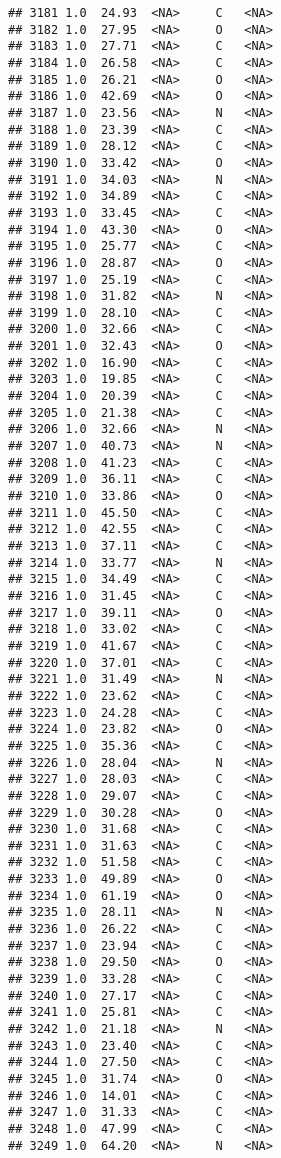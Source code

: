 \documentclass[
]{article}
\begin{document}
\begin{verbatim}
## 3181 1.0  24.93  <NA>     C   <NA>
## 3182 1.0  27.95  <NA>     O   <NA>
## 3183 1.0  27.71  <NA>     C   <NA>
## 3184 1.0  26.58  <NA>     C   <NA>
## 3185 1.0  26.21  <NA>     O   <NA>
## 3186 1.0  42.69  <NA>     O   <NA>
## 3187 1.0  23.56  <NA>     N   <NA>
## 3188 1.0  23.39  <NA>     C   <NA>
## 3189 1.0  28.12  <NA>     C   <NA>
## 3190 1.0  33.42  <NA>     O   <NA>
## 3191 1.0  34.03  <NA>     N   <NA>
## 3192 1.0  34.89  <NA>     C   <NA>
## 3193 1.0  33.45  <NA>     C   <NA>
## 3194 1.0  43.30  <NA>     O   <NA>
## 3195 1.0  25.77  <NA>     C   <NA>
## 3196 1.0  28.87  <NA>     O   <NA>
## 3197 1.0  25.19  <NA>     C   <NA>
## 3198 1.0  31.82  <NA>     N   <NA>
## 3199 1.0  28.10  <NA>     C   <NA>
## 3200 1.0  32.66  <NA>     C   <NA>
## 3201 1.0  32.43  <NA>     O   <NA>
## 3202 1.0  16.90  <NA>     C   <NA>
## 3203 1.0  19.85  <NA>     C   <NA>
## 3204 1.0  20.39  <NA>     C   <NA>
## 3205 1.0  21.38  <NA>     C   <NA>
## 3206 1.0  32.66  <NA>     N   <NA>
## 3207 1.0  40.73  <NA>     N   <NA>
## 3208 1.0  41.23  <NA>     C   <NA>
## 3209 1.0  36.11  <NA>     C   <NA>
## 3210 1.0  33.86  <NA>     O   <NA>
## 3211 1.0  45.50  <NA>     C   <NA>
## 3212 1.0  42.55  <NA>     C   <NA>
## 3213 1.0  37.11  <NA>     C   <NA>
## 3214 1.0  33.77  <NA>     N   <NA>
## 3215 1.0  34.49  <NA>     C   <NA>
## 3216 1.0  31.45  <NA>     C   <NA>
## 3217 1.0  39.11  <NA>     O   <NA>
## 3218 1.0  33.02  <NA>     C   <NA>
## 3219 1.0  41.67  <NA>     C   <NA>
## 3220 1.0  37.01  <NA>     C   <NA>
## 3221 1.0  31.49  <NA>     N   <NA>
## 3222 1.0  23.62  <NA>     C   <NA>
## 3223 1.0  24.28  <NA>     C   <NA>
## 3224 1.0  23.82  <NA>     O   <NA>
## 3225 1.0  35.36  <NA>     C   <NA>
## 3226 1.0  28.04  <NA>     N   <NA>
## 3227 1.0  28.03  <NA>     C   <NA>
## 3228 1.0  29.07  <NA>     C   <NA>
## 3229 1.0  30.28  <NA>     O   <NA>
## 3230 1.0  31.68  <NA>     C   <NA>
## 3231 1.0  31.63  <NA>     C   <NA>
## 3232 1.0  51.58  <NA>     C   <NA>
## 3233 1.0  49.89  <NA>     O   <NA>
## 3234 1.0  61.19  <NA>     O   <NA>
## 3235 1.0  28.11  <NA>     N   <NA>
## 3236 1.0  26.22  <NA>     C   <NA>
## 3237 1.0  23.94  <NA>     C   <NA>
## 3238 1.0  29.50  <NA>     O   <NA>
## 3239 1.0  33.28  <NA>     C   <NA>
## 3240 1.0  27.17  <NA>     C   <NA>
## 3241 1.0  25.81  <NA>     C   <NA>
## 3242 1.0  21.18  <NA>     N   <NA>
## 3243 1.0  23.40  <NA>     C   <NA>
## 3244 1.0  27.50  <NA>     C   <NA>
## 3245 1.0  31.74  <NA>     O   <NA>
## 3246 1.0  14.01  <NA>     C   <NA>
## 3247 1.0  31.33  <NA>     C   <NA>
## 3248 1.0  47.99  <NA>     C   <NA>
## 3249 1.0  64.20  <NA>     N   <NA>

\end{verbatim}
\end{document}
